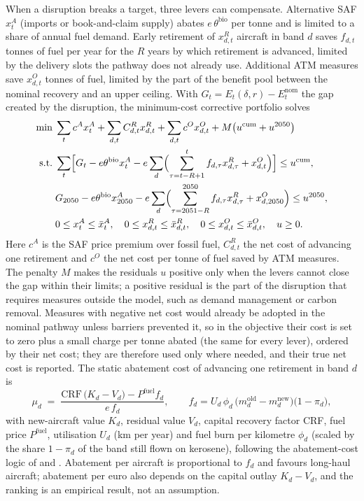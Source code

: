\documentclass[preprint, 12pt, authoryear]{elsarticle}
\begin{document}
When a disruption breaks a target, three levers can compensate. Alternative
SAF $x^{A}_t$ (imports or book-and-claim supply) abates $e\,\theta^{\mathrm{bio}}$
per tonne and is limited to a share of annual fuel demand. Early retirement of
$x^{R}_{d,t}$ aircraft in band $d$ saves $f_{d,t}$ tonnes of fuel per year for
the $R$ years by which retirement is advanced, limited by the delivery slots the
pathway does not already use. Additional ATM measures save $x^{O}_{d,t}$ tonnes
of fuel, limited by the part of the benefit pool between the nominal recovery
and an upper ceiling. With $G_t=E_t(\delta,r)-E^{\mathrm{nom}}_t$ the gap
created by the disruption, the minimum-cost corrective portfolio solves
\begin{align}
\label{eq:lp}
\min\;& \sum_t c^{A}x^{A}_t + \sum_{d,t} C^{R}_{d,t}x^{R}_{d,t} + \sum_{d,t} c^{O}x^{O}_{d,t}
+ M\bigl(u^{\mathrm{cum}}+u^{2050}\bigr)\\
\text{s.t.}\;& \sum_t\Bigl[G_t - e\theta^{\mathrm{bio}}x^{A}_t
- e\sum_d\Bigl(\sum_{\tau=t-R+1}^{t} f_{d,\tau}x^{R}_{d,\tau} + x^{O}_{d,t}\Bigr)\Bigr] \le u^{\mathrm{cum}}, \nonumber\\
& G_{2050} - e\theta^{\mathrm{bio}}x^{A}_{2050}
- e\sum_d\Bigl(\sum_{\tau=2051-R}^{2050} f_{d,\tau}x^{R}_{d,\tau} + x^{O}_{d,2050}\Bigr) \le u^{2050}, \nonumber\\
& 0\le x^{A}_t\le \bar x^{A}_t,\quad 0\le x^{R}_{d,t}\le \bar x^{R}_{d,t},\quad
0\le x^{O}_{d,t}\le \bar x^{O}_{d,t},\quad u\ge 0. \nonumber
\end{align}
Here $c^{A}$ is the SAF price premium over fossil fuel, $C^{R}_{d,t}$ the net cost
of advancing one retirement and $c^{O}$ the net cost per tonne of fuel saved by
ATM measures. The penalty $M$ makes the residuals $u$ positive only when the
levers cannot close the gap within their limits; a positive residual is the part
of the disruption that requires measures outside the model, such as demand
management or carbon removal. Measures with negative net cost would already be adopted in the nominal pathway
unless barriers prevented it, so in the objective their cost is set to zero plus
a small charge per tonne abated (the same for every lever), ordered by their net
cost; they are therefore used only where needed, and their true net cost is
reported. The static abatement cost of advancing one retirement in
band $d$ is
\begin{equation}
\label{eq:mac}
\mu_d \;=\; \frac{\mathrm{CRF}\,\bigl(K_d - V_d\bigr) - P^{\mathrm{fuel}} f_d}{e\,f_d},
\qquad f_d = U_d\,\phi_d\,\bigl(m^{\mathrm{old}}_d - m^{\mathrm{new}}_d\bigr)\bigl(1-\pi_d\bigr),
\end{equation}
with new-aircraft value $K_d$, residual value $V_d$, capital recovery factor
CRF, fuel price $P^{\mathrm{fuel}}$, utilisation $U_d$ (km per year) and fuel
burn per kilometre $\phi_d$ (scaled by the share $1-\pi_d$ of the band still
flown on kerosene), following the abatement-cost logic of
\citet{schafer2016} and \citet{salgas2025}. Abatement per aircraft is
proportional to $f_d$ and favours long-haul aircraft; abatement per euro also
depends on the capital outlay $K_d-V_d$, and the ranking is an empirical result,
not an assumption.
\end{document}
